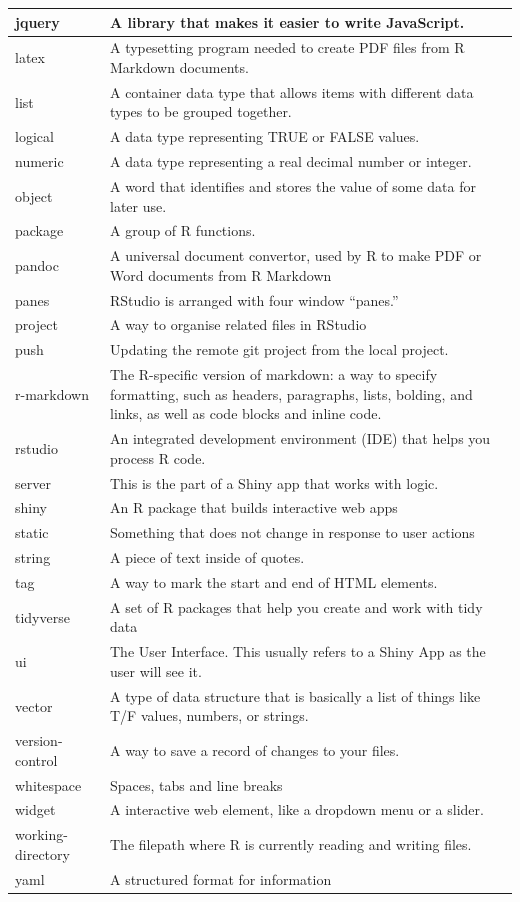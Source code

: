 \documentclass[
]{book}
\begin{document}
\begin{tabular}{l|l}
\hline
jquery & A library that makes it easier to write JavaScript.\\
\hline
latex & A typesetting program needed to create PDF files from R Markdown documents.\\
\hline
list & A container data type that allows items with different data types to be grouped together.\\
\hline
logical & A data type representing TRUE or FALSE values.\\
\hline
numeric & A data type representing a real decimal number or integer.\\
\hline
object & A word that identifies and stores the value of some data for later use.\\
\hline
package & A group of R functions.\\
\hline
pandoc & A universal document convertor, used by R to make PDF or Word documents from R Markdown\\
\hline
panes & RStudio is arranged with four window “panes.”\\
\hline
project & A way to organise related files in RStudio\\
\hline
push & Updating the remote git project from the local project.\\
\hline
r-markdown & The R-specific version of markdown: a way to specify formatting, such as headers, paragraphs, lists, bolding, and links, as well as code blocks and inline code.\\
\hline
rstudio & An integrated development environment (IDE) that helps you process R code.\\
\hline
server & This is the part of a Shiny app that works with logic.\\
\hline
shiny & An R package that builds interactive web apps\\
\hline
static & Something that does not change in response to user actions\\
\hline
string & A piece of text inside of quotes.\\
\hline
tag & A way to mark the start and end of HTML elements.\\
\hline
tidyverse & A set of R packages that help you create and work with tidy data\\
\hline
ui & The User Interface. This usually refers to a Shiny App as the user will see it.\\
\hline
vector & A type of data structure that is basically a list of things like T/F values, numbers, or strings.\\
\hline
version-control & A way to save a record of changes to your files.\\
\hline
whitespace & Spaces, tabs and line breaks\\
\hline
widget & A interactive web element, like a dropdown menu or a slider.\\
\hline
working-directory & The filepath where R is currently reading and writing files.\\
\hline
yaml & A structured format for information\\
\hline
\end{tabular}

  
\end{document}
